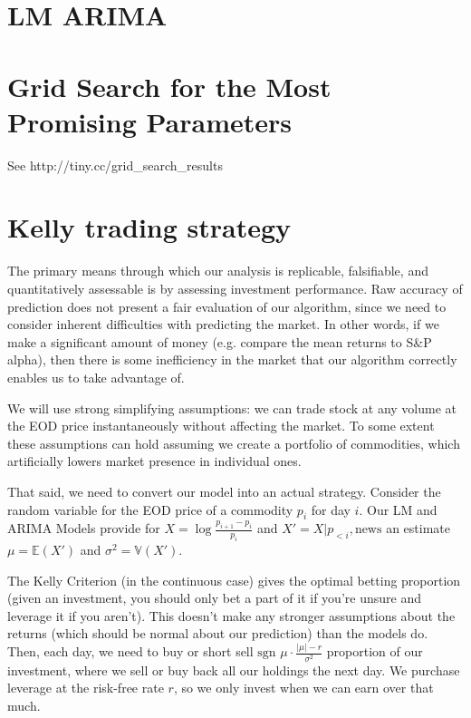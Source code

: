 \documentclass{article}
\begin{document}
	\section{LM ARIMA}

	\section{Grid Search for the Most Promising Parameters}
	
        See http://tiny.cc/grid_search_results


	\section{Kelly trading strategy}
	
The primary means through which our analysis is replicable, falsifiable, and quantitatively assessable is by assessing investment performance. Raw accuracy of prediction does not present a fair evaluation of our algorithm, since we need to consider inherent difficulties with predicting the market. In other words, if we make a significant amount of money (e.g. compare the mean returns to S\&P alpha), then there is some inefficiency in the market that our algorithm correctly enables us to take advantage of.

We will use strong simplifying assumptions: we can trade stock at any volume at the EOD price instantaneously without affecting the market. To some extent these assumptions can hold assuming we create a portfolio of commodities, which artificially lowers market presence in individual ones.

That said, we need to convert our model into an actual strategy. Consider the random variable for the EOD price of a commodity $p_i$ for day $i$. Our LM and ARIMA Models provide for $X = \log\frac{p_{i+1}-p_i}{p_i}$ and $X'=X|p_{<i},\text{news}$ an estimate $\mu=\mathbb{E}(X')$ and $\sigma^2=\mathbb{V}(X')$.

The Kelly Criterion (in the continuous case) gives the optimal betting proportion (given an investment, you should only bet a part of it if you're unsure and leverage it if you aren't). This doesn't make any stronger assumptions about the returns (which should be normal about our prediction) than the models do. Then, each day, we need to buy or short sell $\text{sgn }\mu\cdot\frac{\left|\mu\right|-r}{\sigma^2}$ proportion of our investment, where we sell or buy back all our holdings the next day. We purchase leverage at the risk-free rate $r$, so we only invest when we can earn over that much.
\end{document}
